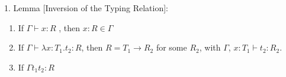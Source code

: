 \documentclass [proof]{article}
\newcommand{\env}{{\Gamma \vdash}}
\begin{document}
\setlength{\oddsidemargin}{0mm}
\setlength{\evensidemargin}{0mm}
\setlength{\topmargin}{0mm}


1. Lemma [Inversion of the Typing Relation]:
\begin{enumerate}
\item If $\env x : R$ , then $x : R \in \Gamma$
\item If $\env \lambda x: T_1. t_2 : R$, then $R = T_1 \to R_2$ for some $R_2$, with $\Gamma$, $x : T_1\vdash t_2 : R_2$.
\item If $\Gamma t_1 t_2 : R$
\end{enumerate}
\end{document}
